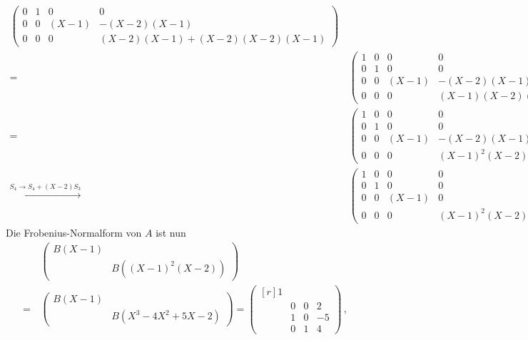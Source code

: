 \begin{align*}
\begin{pmatrix}
      0 & 1 &     0 &                             0 \\
      0 & 0 & (X-1) &                   -(X-2)(X-1) \\
      0 & 0 &     0 &  (X-2)(X-1) + (X-2)(X-2)(X-1)
    \end{pmatrix}
  \\
  =&\,
    \begin{pmatrix}
      1 & 0 &     0 &               0 \\
      0 & 1 &     0 &               0 \\
      0 & 0 & (X-1) &     -(X-2)(X-1) \\
      0 & 0 &     0 & (X-1)(X-2)(X-1)
    \end{pmatrix}
  \\
  =&\,
    \begin{pmatrix}
      1 & 0 &     0 &             0 \\
      0 & 1 &     0 &             0 \\
      0 & 0 & (X-1) &   -(X-2)(X-1) \\
      0 & 0 &     0 & (X-1)^2 (X-2)
    \end{pmatrix}
  \\
  \xrightarrow{S_4 \to S_4 + (X-2) S_3}&\,
    \begin{pmatrix}
      1 & 0 &     0 &             0 \\
      0 & 1 &     0 &             0 \\
      0 & 0 & (X-1) &             0 \\
      0 & 0 &     0 & (X-1)^2 (X-2)
    \end{pmatrix}.
\end{align*}
\endgroup
Die Frobenius-Normalform von $A$ ist nun
\begin{align*}
   &\,  \begin{pmatrix}
          B(X-1)  &                               \\
                  & B\left( (X-1)^2 (X-2) \right)
        \end{pmatrix}
  \\
  =&\,  \begin{pmatrix}
          B(X-1)  &                                     \\
                  & B\left( X^3 - 4X^2 + 5X - 2 \right)
        \end{pmatrix}
  =     \begin{pmatrix*}[r]
          1 &   &   &     \\
            & 0 & 0 &  2  \\
            & 1 & 0 & -5  \\
            & 0 & 1 &  4
        \end{pmatrix*} \,,
\end{align*}
